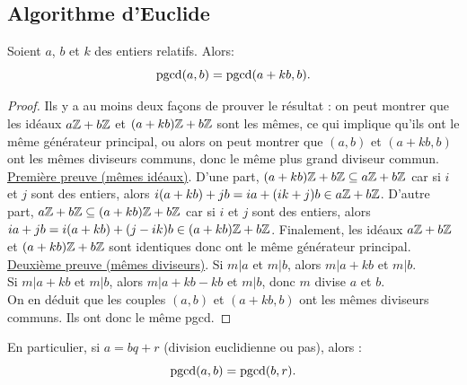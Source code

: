 \subsection{Algorithme d'Euclide}

\begin{lemme}[d'Euclide]
Soient $a$, $b$ et $k$ des entiers relatifs. Alors:
\[ \operatorname{pgcd}(a,b) = \operatorname{pgcd}(a+kb,b).\]
\end{lemme}

\begin{proof}
Ils y a au moins deux façons de prouver le résultat : on peut montrer que les idéaux $a\mathbb{Z}+b\mathbb{Z}$ et $(a+kb)\mathbb{Z}+b\mathbb{Z}$ sont les mêmes, ce qui implique qu'ils ont le même générateur principal, ou alors on peut montrer que $(a,b)$ et $(a+kb,b)$ ont les mêmes diviseurs communs, donc le même plus grand diviseur commun.\\
\underline{Première preuve (mêmes idéaux)}.
D'une part, $(a+kb)\mathbb{Z}+b\mathbb{Z} \subseteq a\mathbb{Z}+b\mathbb{Z}$ car si $i$ et $j$ sont des entiers, alors $i(a+kb)+jb = ia+(ik+j)b \in a\mathbb{Z}+b\mathbb{Z}$.
D'autre part, $a\mathbb{Z}+b\mathbb{Z} \subseteq (a+kb)\mathbb{Z}+b\mathbb{Z}$ car si $i$ et $j$ sont des entiers, alors $ia+jb = i(a+kb) +(j-ik)b \in (a+kb)\mathbb{Z}+b\mathbb{Z}$.
Finalement, les idéaux $a\mathbb{Z}+b\mathbb{Z}$ et $(a+kb)\mathbb{Z}+b\mathbb{Z}$ sont identiques donc ont le même générateur principal.\\
\underline{Deuxième preuve (mêmes diviseurs)}.
Si $m|a$ et $m|b$, alors $m|a+kb$ et $m|b$.\\
Si $m|a+kb$ et $m|b$, alors $m|a+kb-kb$ et $m|b$, donc $m$ divise $a$ et $b$.\\
On en déduit que les couples $(a,b)$ et $(a+kb,b)$ ont les mêmes diviseurs communs. Ils ont donc le même pgcd.
\end{proof}

\begin{corollaire} En particulier, si $a = bq+r$ (division euclidienne ou pas), alors :
\[ \operatorname{pgcd}(a,b) = \operatorname{pgcd}(b,r).\]
\end{corollaire}

